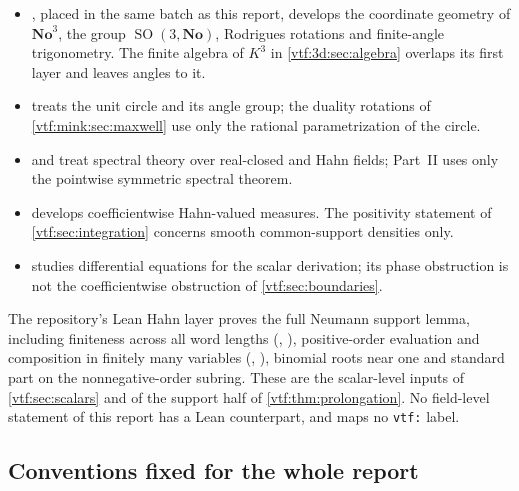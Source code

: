 \documentclass[11pt,letterpaper]{article}
\theoremstyle{definition}
\theoremstyle{remark}
\newcommand{\No}{\mathbf{No}}
\newcommand{\SO}{\operatorname{SO}}\newcommand{\SL}{\operatorname{SL}}
\begin{document}
\begin{itemize}
Its no-oscillation theorem () concerns the
scalar Berarducci--Mantova derivation. The infinite-frequency obstruction
\cref{vtf:mink:thm:highfrequency} concerns coefficientwise derivatives. The two
statements are different.
\item {}, placed in the same batch as this
report, develops the coordinate geometry of $\No^3$, the group $\SO(3,\No)$,
Rodrigues rotations and finite-angle trigonometry. The finite algebra of $K^3$ in
\cref{vtf:3d:sec:algebra} overlaps its first layer and leaves angles to it.
\item {} treats the unit circle and its angle
group; the duality rotations of \cref{vtf:mink:sec:maxwell} use only the
rational parametrization of the circle.
\item {} and
 treat spectral
theory over real-closed and Hahn fields; Part~II uses only the pointwise
symmetric spectral theorem.
\item {} develops
coefficientwise Hahn-valued measures. The positivity statement of
\cref{vtf:sec:integration} concerns smooth common-support densities only.
\item {} studies differential
equations for the scalar derivation; its phase obstruction is not the
coefficientwise obstruction of \cref{vtf:sec:boundaries}.
\end{itemize}
The repository's Lean Hahn layer proves the full Neumann support lemma,
including finiteness across all word lengths
(, ), positive-order
evaluation and composition in finitely many variables
(, ), binomial roots near one
and standard part on the nonnegative-order subring. These are the scalar-level
inputs of \cref{vtf:sec:scalars} and of the support half of
\cref{vtf:thm:prolongation}. No field-level statement of this report has a Lean
counterpart, and  maps no \texttt{vtf:} label.

\subsection{Conventions fixed for the whole report}\label{vtf:subsec:conventions}
\end{document}
